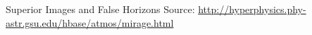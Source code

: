 \documentclass[linespread=1.4,t]{ctexbeamer}
\begin{document}
\begin{frame}
\begin{block}{Superior Images and False Horizons \citep{Mirage-Greenler1980,AtmRefrac-Hyperphysics}}
Source: \url{http://hyperphysics.phy-astr.gsu.edu/hbase/atmos/mirage.html}
\end{block}

\vfill

\begin{block}{\refname}
\renewcommand*{\bibfont}{\relsize{-1}\linespread{1}\selectfont}
\setlength{\biblabelsep}{0.25em}
\printbibliography[heading=none]
\end{block}

\end{frame}
\end{document}
